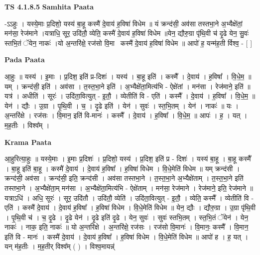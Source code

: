 \documentclass[17pt]{extarticle}
\begin{document}
\textbf{TS 4.1.8.5 } \newline
\textbf{Samhita Paata} \newline

-ऽऽहुः । यस्ये॒माः प्र॒दिशो॒ यस्य॑ बा॒हू कस्मै॑ दे॒वाय॑ ह॒विषा॑ विधेम ॥ यं क्रन्द॑सी॒ अव॑सा तस्तभा॒ने अ॒भ्यैक्षे॑तां॒ मन॑सा॒ रेज॑माने ।यत्राधि॒ सूर॒ उदि॑तौ॒ व्येति॒ कस्मै॑ दे॒वाय॑ ह॒विषा॑ विधेम ॥येन॒ द्यौरु॒ग्रा पृ॑थि॒वी च॑ दृ॒ढे येन॒ सु॒वः॑ स्तभि॒तं ॅयेन॒ नाकः॑ ।यो अ॒न्तरि॑क्षे॒ रज॑सो वि॒मानः᳡कस्मै॑ दे॒वाय॑ ह॒विषा॑ विधेम ॥ आपो॑ ह॒ यन्म॑ह॒ती र्विश्व॒ - [  ] \newline

\textbf{Pada Paata} \newline

आ॒हुः ॥ यस्य॑ । इ॒माः । प्र॒दिश॒ इति॑ प्र-दिशः॑ । यस्य॑ । बा॒हू इति॑ । कस्मै᳚ । दे॒वाय॑ । ह॒विषा᳚ । वि॒धे॒म॒ ॥ यम् । क्रन्द॑सी॒ इति॑ । अव॑सा । त॒स्त॒भा॒ने इति॑ । अ॒भ्यैक्षे॑ता॒मित्य॑भि - ऐक्षे॑तां । मन॑सा । रेज॑माने॒ इति॑ ॥ यत्र॑ । अधीति॑ । सूरः॑ । उदि॑ता॒वित्युत् - इ॒तौ॒ । व्येतीति॑ वि - एति॑ । कस्मै᳚ । दे॒वाय॑ । ह॒विषा᳚ । वि॒धे॒म॒ ॥ येन॑ । द्यौः । उ॒ग्रा । पृ॒थि॒वी । च॒ । दृ॒ढे इति॑ । येन॑ । सुवः॑ । स्त॒भि॒तम् । येन॑ । नाकः॑ ॥ यः । अ॒न्तरि॑क्षे । रज॑सः । वि॒मान॒ इति॑ वि-मानः॑ । कस्मै᳚ । दे॒वाय॑ । ह॒विषा᳚ । वि॒धे॒म॒ ॥ आपः॑ । ह॒ । यत् । म॒ह॒तीः । विश्व᳚म् ।  \newline


\textbf{Krama Paata} \newline

आ॒हुरित्या॒हुः ॥ यस्ये॒माः । इ॒माः प्र॒दिशः॑ । प्र॒दिशो॒ यस्य॑ । प्र॒दिश॒ इति॑ प्र - दिशः॑ । यस्य॑ बा॒हू । बा॒हू कस्मै᳚ । बा॒हू इति॑ बा॒हू । कस्मै॑ दे॒वाय॑ । दे॒वाय॑ ह॒विषा᳚ । ह॒विषा॑ विधेम । वि॒धे॒मेति॑ विधेम ॥ यम् क्रन्द॑सी । क्रन्द॑सी॒ अव॑सा । क्रन्द॑सी॒ इति॒ क्रन्द॑सी । अव॑सा तस्तभा॒ने । त॒स्त॒भा॒ने अ॒भ्यैक्षे॑ताम् । त॒स्त॒भा॒ने इति॑ तस्तभा॒ने । अ॒भ्यैक्षे॑ता॒म् मन॑सा । अ॒भ्यैक्षे॑ता॒मित्य॑भि - ऐक्षे॑ताम् । मन॑सा॒ रेज॑माने । रेज॑माने॒ इति॒ रेज॑माने ॥ यत्राऽधि॑ । अधि॒ सूरः॑ । सूर॒ उदि॑तौ । उदि॑तौ॒ व्येति॑ । उदि॑ता॒वित्युत् - इ॒तौ॒ । व्येति॒ कस्मै᳚ । व्येतीति॑ वि - एति॑ । कस्मै॑ दे॒वाय॑ । दे॒वाय॑ ह॒विषा᳚ । ह॒विषा॑ विधेम । वि॒धे॒मेति॑ विधेम ॥ येन॒ द्यौः । द्यौरु॒ग्रा । उ॒ग्रा पृ॑थि॒वी । पृ॒थि॒वी च॑ । च॒ दृ॒ढे । दृ॒ढे येन॑ । दृ॒ढे इति॑ दृ॒ढे । येन॒ सुवः॑ । सुवः॑ स्तभि॒तम् । स्त॒भि॒तं ॅयेन॑ । येन॒ नाकः॑ । नाक॒ इति॒ नाकः॑ ॥ यो अ॒न्तरि॑क्षे । अ॒न्तरि॑क्षे॒ रज॑सः । रज॑सो वि॒मानः॑ । वि॒मानः॒ कस्मै᳚ । वि॒मान॒ इति॑ वि - मानः॑ । कस्मै॑ दे॒वाय॑ । दे॒वाय॑ ह॒विषा᳚ । ह॒विषा॑ विधेम । वि॒धे॒मेति॑ विधेम ॥ आपो॑ ह । ह॒ यत् । यन् म॑ह॒तीः । म॒ह॒तीर् विश्व᳚म् ( ) । विश्व॒मायन्न्॑ \newline
\end{document}
